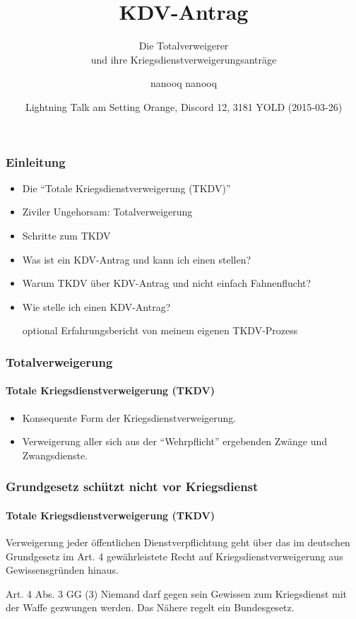 \documentclass{beamer}
\title[KDV-Antrag] %
{KDV-Antrag}
\subtitle{Die Totalverweigerer \\und ihre Kriegsdienstverweigerungsanträge}
\author[nanooq nanooq] 
{nanooq nanooq}
\institute[Hackspace Siegen e.~V.] %
{
	\inst{1}%
	Hackspace Siegen e.~V.\\
	Effertsufer 104\\
	57072 Siegen
}
\date[2015-03-26] %
{Lightning Talk am Setting Orange, Discord 12, 3181 YOLD (2015-03-26)}
\begin{document}
	
	\frame{\titlepage}
	
	\begin{frame}
	  	\frametitle{Einleitung}	  
	  	\begin{itemize}
	  		\item Die \enquote{Totale Kriegsdienstverweigerung (TKDV)}
	  		\item Ziviler Ungehorsam: Totalverweigerung
	  		\item Schritte zum TKDV
	  		\item Was ist ein KDV-Antrag und kann ich einen stellen?
	  		\item Warum TKDV über KDV-Antrag und nicht einfach Fahnenflucht?
	  		\item Wie stelle ich einen KDV-Antrag?
		  	\item[optional] Erfahrungsbericht von meinem eigenen TKDV-Prozess
	  	\end{itemize}		
	\end{frame}

	\begin{frame}
	  	\frametitle{Totalverweigerung}
	  	\framesubtitle{Totale Kriegsdienstverweigerung (TKDV)}
	  	\begin{itemize}
	  		\item Konsequente Form der Kriegsdienstverweigerung. 		
	  		\item Verweigerung aller sich aus der \enquote{Wehrpflicht} ergebenden Zwänge und Zwangsdienste. 
	  	\end{itemize}
  	\end{frame}
  	
  	\begin{frame}
	  	\frametitle{Grundgesetz schützt nicht vor Kriegsdienst}
	  	\framesubtitle{Totale Kriegsdienstverweigerung (TKDV)}
	  	
	  	Verweigerung jeder öffentlichen Dienstverpflichtung geht über das im deutschen Grundgesetz im Art. 4 gewährleistete Recht auf Kriegsdienstverweigerung aus Gewissensgründen hinaus.

	  	\begin{block}{Art. 4 Abs. 3 GG}
	  		(3) Niemand darf gegen sein Gewissen zum Kriegsdienst mit der Waffe gezwungen werden. Das Nähere regelt ein Bundesgesetz.
	  	\end{block}
  	\end{frame}
	
\end{document}
